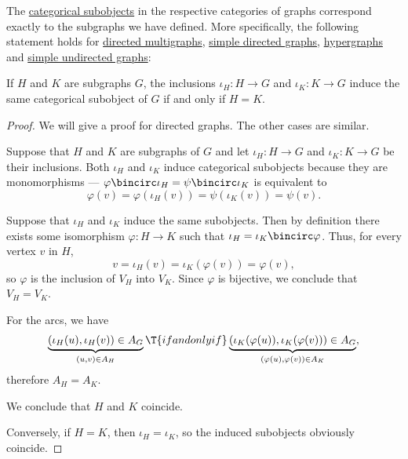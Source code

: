 \begin{proposition}\label{thm:subgraphs}
  The \hyperref[def:categorical_subobject]{categorical subobjects} in the respective categories of graphs correspond exactly to the subgraphs we have defined. More specifically, the following statement holds for \hyperref[def:directed_multigraph]{directed multigraphs}, \hyperref[def:directed_graph]{simple directed graphs}, \hyperref[def:hypergraph]{hypergraphs} and \hyperref[def:undirected_graph]{simple undirected graphs}:
  \begin{displayquote}
    If \( H \) and \( K \) are subgraphs \( G \), the inclusions \( \iota_H: H \to G \) and \( \iota_K: K \to G \) induce the same categorical subobject of \( G \) if and only if \( H = K \).
  \end{displayquote}
\end{proposition}
\begin{proof}
  We will give a proof for directed graphs. The other cases are similar.

  Suppose that \( H \) and \( K \) are subgraphs of \( G \) and let \( \iota_H: H \to G \) and \( \iota_K: K \to G \) be their inclusions. Both \( \iota_H \) and \( \iota_K \) induce categorical subobjects because they are monomorphisms --- \( \varphi \bincirc \iota_H = \psi \bincirc \iota_K \) is equivalent to
  \begin{equation*}
    \varphi(v) = \varphi(\iota_H(v)) = \psi(\iota_K(v)) = \psi(v).
  \end{equation*}

  \SufficiencySubProof Suppose that \( \iota_H \) and \( \iota_K \) induce the same subobjects. Then by definition there exists some isomorphism \( \varphi: H \to K \) such that \( \iota_H = \iota_K \bincirc \varphi \). Thus, for every vertex \( v \) in \( H \),
  \begin{equation*}
    v = \iota_H(v) = \iota_K(\varphi(v)) = \varphi(v),
  \end{equation*}
  so \( \varphi \) is the inclusion of \( V_H \) into \( V_K \). Since \( \varphi \) is bijective, we conclude that \( V_H = V_K \).

  For the arcs, we have
  \begin{equation*}
    \underbrace{(\iota_H(u), \iota_H(v)) \in A_G}_{(u, v) \in A_H} \T{if and only if} \underbrace{(\iota_K(\varphi(u)), \iota_K(\varphi(v))) \in A_G}_{(\varphi(u), \varphi(v)) \in A_K},
  \end{equation*}
  therefore \( A_H = A_K \).

  We conclude that \( H \) and \( K \) coincide.

  \NecessitySubProof Conversely, if \( H = K \), then \( \iota_H = \iota_K \), so the induced subobjects obviously coincide.
\end{proof}

